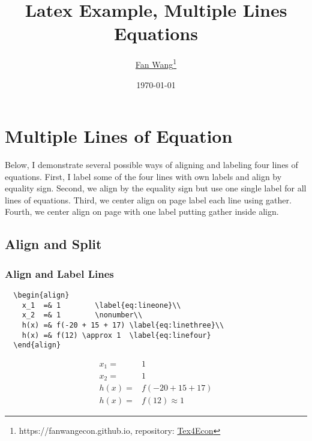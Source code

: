\documentclass[12pt,english]{article}
\title{Latex Example, Multiple Lines Equations}
\author{\href{https://fanwangecon.github.io/}{Fan Wang}\thanks{https://fanwangecon.github.io, repository: \href{https://fanwangecon.github.io/Tex4Econ/}{Tex4Econ}}}
\date{\today}
\begin{document}
\maketitle

\section{Multiple Lines of Equation}

Below, I demonstrate several possible ways of aligning and labeling four lines of equations. First, I label some of the four lines with own labels and align by equality sign. Second, we align by the equality sign but use one single label for all lines of equations. Third, we center align on page label each line using gather. Fourth, we center align on page with one label putting gather inside align.

\pagebreak
\subsection{Align and Split}
\subsubsection{Align and Label Lines}
\begin{verbatim}
  \begin{align}
    x_1  =& 1        \label{eq:lineone}\\
    x_2  =& 1        \nonumber\\
    h(x) =& f(-20 + 15 + 17) \label{eq:linethree}\\
    h(x) =& f(12) \approx 1  \label{eq:linefour}
  \end{align}
\end{verbatim}
\begin{align}
  x_1  =& 1        \label{eq:lineone}\\
  x_2  =& 1        \nonumber\\
  h(x) =& f(-20 + 15 + 17) \label{eq:linethree}\\
  h(x) =& f(12) \approx 1  \label{eq:linefour}
\end{align}
\end{document}
